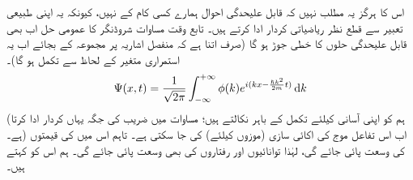  اس کا ہرگز یہ مطلب نہیں کہ قابل علیحدگی احوال  ہمارے کسی کام کے نہیں،  کیونکہ یہ اپنی   طبیعی تعبیر سے قطع نظر    ریاضیاتی کردار ادا کرتے ہیں۔ تابع وقت مساوات شروڈنگر کا عمومی حل اب بھی قابل علیحدگی حلوں کا خطی جوڑ ہو گا (صرف اتنا ہے کہ منفصل اشاریہ  پر مجموعہ کے بجائے اب یہ استمراری متغیر  کے لحاظ سے تکمل ہو گا)۔
\begin{align}\label{مساوات_غیر_تابع_استمراری_شروڈنگر_حل}
\Psi(x,t)=\frac{1}{\sqrt{2\pi}}\int_{-\infty}^{+\infty}\phi(k)e^{i(kx-\frac{\hslash k^{2}}{2m}t)}\dif{k}
\end{align}
(ہم  کو اپنی آسانی کیلئے تکمل کے باہر نکالتے ہیں؛ مساوات 
  میں  ضریب   کی جگہ یہاں  کردار ادا کرتا ہے۔) اب اس تفاعل موج کی   اکائی سازی (موزوں  کیلئے)  کی جا سکتی ہے۔ تاہم اس میں  کی قیمتوں کی وسعت  پائی جائے گی، لہٰذا توانائیوں اور رفتاروں کی بھی وسعت پائی جائے  گی۔ ہم اس کو  کہتے ہیں۔

